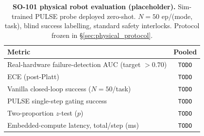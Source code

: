 \begin{table}[t]
\centering
\small
\caption{\textbf{SO-101 physical robot evaluation (placeholder).} Sim-trained PULSE probe deployed zero-shot. $N{=}50$ ep/(mode, task), blind success labelling, standard safety interlocks. Protocol frozen in \S\ref{sec:physical_protocol}.}
\label{tab:so101_results}
\setlength{\tabcolsep}{6pt}
\begin{tabular}{lc}
\toprule
\textbf{Metric} & \textbf{Pooled} \\
\midrule
Real-hardware failure-detection AUC (target ${>}0.70$) & \texttt{TODO} \\
ECE (post-Platt) & \texttt{TODO} \\
Vanilla closed-loop success ($N{=}50$/task)   & \texttt{TODO} \\
PULSE single-step gating success              & \texttt{TODO} \\
Two-proportion $z$-test ($p$)                 & \texttt{TODO} \\
Embedded-compute latency, total/step (ms)     & \texttt{TODO} \\
\bottomrule
\end{tabular}
\end{table}
